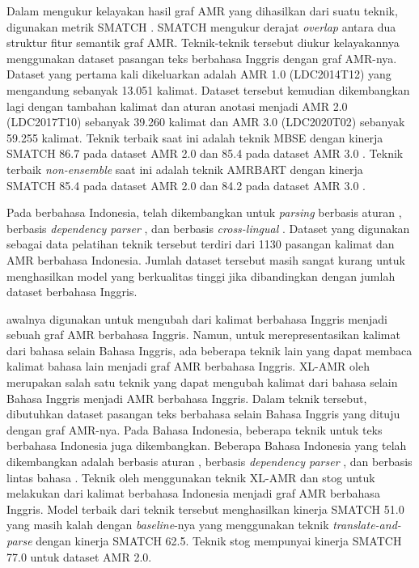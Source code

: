 Dalam mengukur kelayakan hasil graf \gls{AMR} yang dihasilkan dari suatu teknik, digunakan metrik \gls{SMATCH} .
SMATCH mengukur derajat \textit{overlap} antara dua struktur fitur semantik graf \gls{AMR}.
Teknik-teknik \amrparsing{} tersebut diukur kelayakannya menggunakan dataset pasangan teks berbahasa Inggris dengan graf AMR-nya.
Dataset yang pertama kali dikeluarkan adalah AMR 1.0 (LDC2014T12) yang mengandung sebanyak 13.051 kalimat.
Dataset tersebut kemudian dikembangkan lagi dengan tambahan kalimat dan aturan anotasi menjadi AMR 2.0 (LDC2017T10) sebanyak 39.260 kalimat dan AMR 3.0 (LDC2020T02) sebanyak 59.255 kalimat.
Teknik \amrparsing{} terbaik saat ini adalah teknik MBSE dengan kinerja SMATCH 86.7 pada dataset \gls{AMR} 2.0 dan 85.4 pada dataset \gls{AMR} 3.0 .
Teknik \amrparsing{} terbaik \textit{non-ensemble} saat ini adalah teknik AMRBART dengan kinerja SMATCH 85.4 pada dataset \gls{AMR} 2.0 dan 84.2 pada dataset \gls{AMR} 3.0 .


Pada \amrparsing{} berbahasa Indonesia, telah dikembangkan untuk \textit{parsing} berbasis aturan , berbasis \textit{dependency parser} , dan berbasis \textit{cross-lingual} .
Dataset yang digunakan sebagai data pelatihan teknik tersebut terdiri dari 1130 pasangan kalimat dan AMR berbahasa Indonesia.
Jumlah dataset tersebut masih sangat kurang untuk menghasilkan model yang berkualitas tinggi jika dibandingkan dengan jumlah dataset berbahasa Inggris.

\amrparsing{} awalnya digunakan untuk mengubah dari kalimat berbahasa Inggris menjadi sebuah graf \gls{AMR} berbahasa Inggris.
Namun, untuk merepresentasikan kalimat dari bahasa selain Bahasa Inggris, ada beberapa teknik lain yang dapat membaca kalimat bahasa lain menjadi graf \gls{AMR} berbahasa Inggris.
\gls{XL-AMR} oleh \textcite{blloshmi2020} merupakan salah satu teknik yang dapat mengubah kalimat dari bahasa selain Bahasa Inggris menjadi \gls{AMR} berbahasa Inggris.
Dalam teknik tersebut, dibutuhkan dataset pasangan teks berbahasa selain Bahasa Inggris yang dituju dengan graf \gls{AMR}-nya.
Pada Bahasa Indonesia, beberapa teknik \amrparsing{} untuk teks berbahasa Indonesia juga dikembangkan.
Beberapa \amrparsing{} Bahasa Indonesia yang telah dikembangkan adalah \amrparsing{} berbasis aturan , berbasis \textit{dependency parser} , dan berbasis lintas bahasa .
Teknik \amrparsing{} oleh \textcite{putra2022} menggunakan teknik XL-\gls{AMR} dan stog untuk melakukan \amrparsing{} dari kalimat berbahasa Indonesia menjadi graf \gls{AMR} berbahasa Inggris.
Model terbaik dari teknik tersebut menghasilkan kinerja SMATCH 51.0 yang masih kalah dengan \textit{baseline}-nya yang menggunakan teknik \textit{translate-and-parse} dengan kinerja SMATCH 62.5.
Teknik \amrparsing{} stog mempunyai kinerja SMATCH 77.0 untuk dataset \gls{AMR} 2.0.

